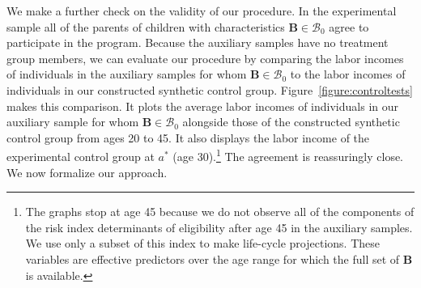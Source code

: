 \begin{figure}
\end{figure}

We make a further check on the validity of our procedure. In the experimental sample all of the parents of children with characteristics $\bm{B} \in \mathcal{B}_0$ agree to participate in the program.  Because the auxiliary samples have no treatment group members, we can evaluate our procedure by comparing the labor incomes of individuals in the auxiliary samples for whom $\bm{B} \in \mathcal{B}_0$ to the labor incomes of individuals in our constructed synthetic control group. Figure~\ref{figure:controltests} makes this comparison. It plots the average labor incomes of individuals in our auxiliary sample for whom $\bm{B} \in \mathcal{B}_0$ alongside those of the constructed synthetic control group from ages 20 to 45. It also displays the labor income of the experimental control group at $a^*$ (age 30).\footnote{The graphs stop at age 45 because we do not observe all of the components of the risk index determinants of eligibility after age 45 in the auxiliary samples. We use only a subset of this index to make life-cycle projections. These variables are effective predictors over the age range for which the full set of $\bm{B}$ is available.} The agreement is reassuringly close. We now formalize our approach.

